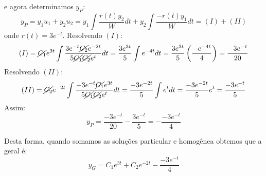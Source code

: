 e agora determinamos $y_P$:
\begin{equation*}
  y_P = y_1u_1 + y_2u_2 = y_1\int \frac{r(t)y_2}{W} dt + y_2\int \frac{-r(t)y_1}{W} dt = (I) + (II)
\end{equation*}
onde $r(t) = 3e^{-t}$. Resolvendo $(I)$:
\begin{equation*}
    (I) = \cancel{C_1}e^{3t}\int \frac{3e^{-t}\cancel{C_2}e^{-2t}}{5\cancel{C_1}\cancel{C_2}e^t}dt = \frac{3e^{3t}}{5}\int e^{-4t}dt = \frac{3e^{3t}}{5}\left(\frac{-e^{-4t}}{4}\right) = \frac{-3e^{-t}}{20}
\end{equation*}
Resolvendo $(II)$:
\begin{equation*}
    (II) = \cancel{C_2}e^{-2t}\int \frac{-3e^{-t}\cancel{C_1}e^{3t}}{5\cancel{C_1}\cancel{C_2}e^t}dt = \frac{-3e^{-2t}}{5}\int e^tdt = \frac{-3e^{-2t}}{5}e^t = \frac{-3e^{-t}}{5}
\end{equation*}
Assim:
\begin{equation*}
    y_P = \frac{-3e^{-t}}{20} - \frac{3e^{-t}}{5} = -\frac{-3e^{-t}}{4}
\end{equation*}

Desta forma, quando somamos as soluções particular e homogênea obtemos que a geral é:
\begin{equation*}
    y_G = C_1e^{3t} + C_2e^{-2t} - \frac{-3e^{-t}}{4}
\end{equation*}